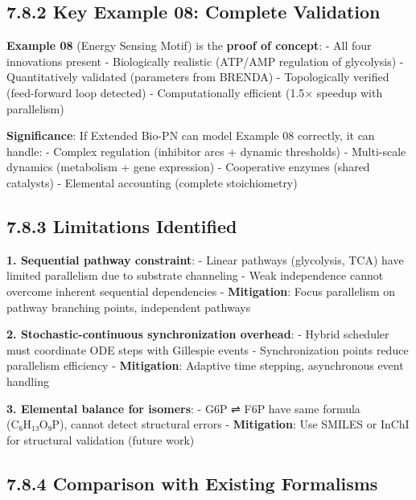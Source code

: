 \hypertarget{key-example-08-complete-validation}{%
\subsection{7.8.2 Key Example 08: Complete
Validation}\label{key-example-08-complete-validation}}

\textbf{Example 08} (Energy Sensing Motif) is the \textbf{proof of
concept}: - \checkmark All four innovations present - \checkmark Biologically realistic
(ATP/AMP regulation of glycolysis) - \checkmark Quantitatively validated
(parameters from BRENDA) - \checkmark Topologically verified (feed-forward loop
detected) - \checkmark Computationally efficient (1.5× speedup with parallelism)

\textbf{Significance}: If Extended Bio-PN can model Example 08
correctly, it can handle: - Complex regulation (inhibitor arcs + dynamic
thresholds) - Multi-scale dynamics (metabolism + gene expression) -
Cooperative enzymes (shared catalysts) - Elemental accounting (complete
stoichiometry)

\hypertarget{limitations-identified}{%
\subsection{7.8.3 Limitations Identified}\label{limitations-identified}}

\textbf{1. Sequential pathway constraint}: - Linear pathways
(glycolysis, TCA) have limited parallelism due to substrate channeling -
Weak independence cannot overcome inherent sequential dependencies -
\textbf{Mitigation}: Focus parallelism on pathway branching points,
independent pathways

\textbf{2. Stochastic-continuous synchronization overhead}: - Hybrid
scheduler must coordinate ODE steps with Gillespie events -
Synchronization points reduce parallelism efficiency -
\textbf{Mitigation}: Adaptive time stepping, asynchronous event handling

\textbf{3. Elemental balance for isomers}: - G6P ⇌ F6P have same formula
(C₆H₁₃O₉P), cannot detect structural errors - \textbf{Mitigation}: Use
SMILES or InChI for structural validation (future work)

\hypertarget{comparison-with-existing-formalisms}{%
\subsection{7.8.4 Comparison with Existing
Formalisms}\label{comparison-with-existing-formalisms}}

